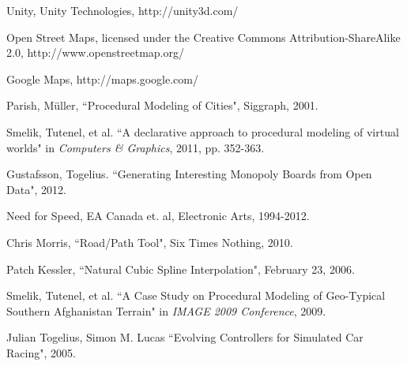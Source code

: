 \documentclass[conference]{IEEEtran}
\begin{document}
\begin{thebibliography}{6}
 Unity, Unity Technologies, http://unity3d.com/

 Open Street Maps, licensed under the Creative Commons Attribution-ShareAlike 2.0, http://www.openstreetmap.org/

 Google Maps, http://maps.google.com/

 Parish, Müller, ``Procedural Modeling of Cities", Siggraph, 2001.

Smelik, Tutenel, et al. ``A declarative approach to procedural modeling of virtual worlds" in \emph{Computers \& Graphics}, 2011, pp. 352-363.

 Gustafsson, Togelius. ``Generating Interesting Monopoly Boards from Open Data", 2012.

 Need for Speed, EA Canada et. al, Electronic Arts, 1994-2012.

 Chris Morris, ``Road/Path Tool",  Six Times Nothing, 2010.

 Patch Kessler, ``Natural Cubic Spline Interpolation", February 23, 2006.

Smelik, Tutenel, et al. ``A Case Study on Procedural Modeling of Geo-Typical Southern Afghanistan Terrain" in \emph{IMAGE 2009 Conference}, 2009.

Julian Togelius, Simon M. Lucas ``Evolving Controllers for Simulated Car Racing", 2005.

\end{thebibliography}

\end{document}
